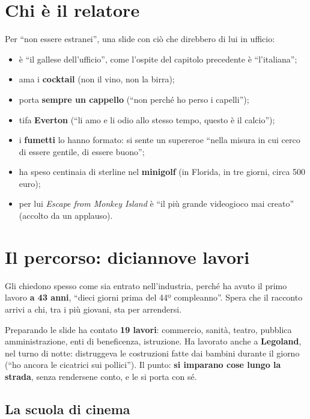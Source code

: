 \section{Chi è il relatore}
\label{sec:c2-2-chi}

Per ``non essere estranei'', una slide con ciò che direbbero di lui in ufficio:
\begin{itemize}
  \item è ``il gallese dell'ufficio'', come l'ospite del capitolo precedente è
        ``l'italiana'';
  \item ama i \textbf{cocktail} (non il vino, non la birra);
  \item porta \textbf{sempre un cappello} (``non perché ho perso i capelli'');
  \item tifa \textbf{Everton} (``li amo e li odio allo stesso tempo, questo è il
        calcio'');
  \item i \textbf{fumetti} lo hanno formato: si sente un supereroe ``nella misura
        in cui cerco di essere gentile, di essere buono'';
  \item ha speso centinaia di sterline nel \textbf{minigolf} (in Florida, in tre
        giorni, circa 500 euro);
  \item per lui \emph{Escape from Monkey Island} è ``il più grande videogioco mai
        creato'' (accolto da un applauso).
\end{itemize}

\section{Il percorso: diciannove lavori}
\label{sec:c2-2-percorso}

Gli chiedono spesso come sia entrato nell'industria, perché ha avuto il primo
lavoro \textbf{a 43 anni}, ``dieci giorni prima del 44º compleanno''. Spera che il
racconto arrivi a chi, tra i più giovani, sta per arrendersi.

Preparando le slide ha contato \textbf{19 lavori}: commercio, sanità, teatro,
pubblica amministrazione, enti di beneficenza, istruzione. Ha lavorato anche a
\textbf{Legoland}, nel turno di notte: distruggeva le costruzioni fatte dai bambini
durante il giorno (``ho ancora le cicatrici sui pollici''). Il punto: \textbf{si
imparano cose lungo la strada}, senza rendersene conto, e le si porta con sé.

\subsection{La scuola di cinema}

